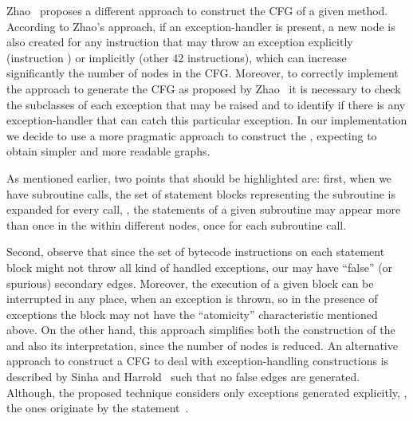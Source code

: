 

Zhao~\cite{Zhao99ACFJ} proposes a different approach to construct
the CFG of a given method. According to Zhao's approach, if an
exception-handler is present, a new node is also created for any
instruction that may throw an exception explicitly (instruction
) or implicitly (other 42 instructions), which can
increase significantly the number of nodes in the CFG. Moreover,
to correctly implement the approach to generate the CFG as
proposed by Zhao~\cite{Zhao99ACFJ} it is necessary to check the
subclasses of each exception that may be raised and to identify if
there is any exception-handler that can catch this particular
exception. In our implementation we decide to use a more pragmatic
approach to construct the \BG, expecting to obtain simpler and
more readable graphs.

As mentioned earlier, two points that should be highlighted are:
first, when we have subroutine calls, the set of statement blocks
representing the subroutine is expanded for every call, \ie, the
statements of a given subroutine may appear more than once in the
\BG within different nodes, once for each subroutine call.

Second, observe that since the set of bytecode instructions on
each statement block might not throw all kind of handled
exceptions, our \BG may have ``false'' (or spurious) secondary
edges. Moreover, the execution of a given block can be interrupted
in any place, when an exception is thrown, so in the presence of
exceptions the block may not have the ``atomicity'' characteristic
mentioned above. On the other hand, this approach simplifies both
the construction of the \BG and also its interpretation, since the
number of nodes is reduced. An alternative approach to construct a
CFG to deal with exception-handling constructions is described by
Sinha and Harrold~\cite{Sinha98APEH} such that no false edges are
generated. Although, the proposed technique considers only
exceptions generated explicitly, \ie, the ones originate by the
 statement~\cite{Sinha98APEH}.




